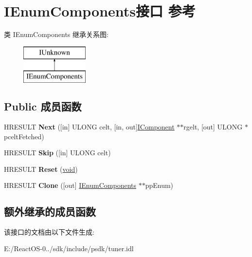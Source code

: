\hypertarget{interface_i_enum_components}{}\section{I\+Enum\+Components接口 参考}
\label{interface_i_enum_components}
类 I\+Enum\+Components 继承关系图\+:\begin{figure}[H]
\begin{center}
\leavevmode
\includegraphics[height=2.000000cm]{interface_i_enum_components}
\end{center}
\end{figure}
\subsection*{Public 成员函数}
\begin{DoxyCompactItemize}
\item 
\mbox{\label{interface_i_enum_components_a0c952fceec37cf3109e008f5296a8575}} 
H\+R\+E\+S\+U\+LT {\bfseries Next} (\mbox{[}in\mbox{]} U\+L\+O\+NG celt, \mbox{[}in, out\mbox{]}\hyperlink{interface_i_component}{I\+Component} $\ast$$\ast$rgelt, \mbox{[}out\mbox{]} U\+L\+O\+NG $\ast$pcelt\+Fetched)
\item 
\mbox{\label{interface_i_enum_components_ac74bb8023cbeb64611a8804862372f29}} 
H\+R\+E\+S\+U\+LT {\bfseries Skip} (\mbox{[}in\mbox{]} U\+L\+O\+NG celt)
\item 
\mbox{\label{interface_i_enum_components_af0e32a4da58f30d1588f6a6cc797542b}} 
H\+R\+E\+S\+U\+LT {\bfseries Reset} (\hyperlink{interfacevoid}{void})
\item 
\mbox{\label{interface_i_enum_components_adb7264fdec0d1f8aff865d23827e2e0f}} 
H\+R\+E\+S\+U\+LT {\bfseries Clone} (\mbox{[}out\mbox{]} \hyperlink{interface_i_enum_components}{I\+Enum\+Components} $\ast$$\ast$pp\+Enum)
\end{DoxyCompactItemize}
\subsection*{额外继承的成员函数}


该接口的文档由以下文件生成\+:\begin{DoxyCompactItemize}
\item 
E\+:/\+React\+O\+S-\/0../sdk/include/psdk/tuner.\+idl\end{DoxyCompactItemize}
